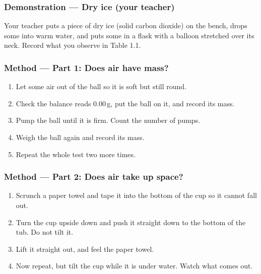 \subsubsection*{Demonstration --- Dry ice (your teacher)}
Your teacher puts a piece of dry ice (solid carbon dioxide) on the bench, drops some into warm water, and puts some in a flask with a balloon stretched over its neck. Record what you observe in Table 1.1.

\subsubsection*{Method --- Part 1: Does air have mass?}
\begin{enumerate}[itemsep=2pt]
  \item Let some air out of the ball so it is soft but still round.
  \item Check the balance reads 0.00\,g, put the ball on it, and record its mass.
  \item Pump the ball until it is firm. Count the number of pumps.
  \item Weigh the ball again and record its mass.
  \item Repeat the whole test two more times.
\end{enumerate}

\subsubsection*{Method --- Part 2: Does air take up space?}
\begin{enumerate}[itemsep=2pt]
  \item Scrunch a paper towel and tape it into the bottom of the cup so it cannot fall out.
  \item Turn the cup upside down and push it straight down to the bottom of the tub. Do not tilt it.
  \item Lift it straight out, and feel the paper towel.
  \item Now repeat, but tilt the cup while it is under water. Watch what comes out.
\end{enumerate}


